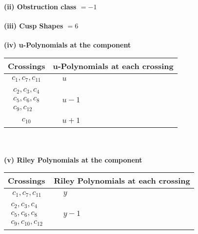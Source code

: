 \documentclass[1p]{elsarticle_modified}
\theoremstyle{definition}
\begin{document}
\flushleft \textbf{(ii) Obstruction class $= -1$}\\~\\
\flushleft \textbf{(iii) Cusp Shapes $= 6$}\\~\\
\newpage\renewcommand{\arraystretch}{1}
\flushleft \textbf{(iv) u-Polynomials at the component}\newline \\
\begin{tabular}{m{50pt}|m{274pt}}
Crossings & \hspace{64pt}u-Polynomials at each crossing \\
\hline $$\begin{aligned}c_{1},c_{7},c_{11}\end{aligned}$$&$\begin{aligned}
&u
\end{aligned}$\\
\hline $$\begin{aligned}c_{2},c_{3},c_{4}\\c_{5},c_{6},c_{8}\\c_{9},c_{12}\end{aligned}$$&$\begin{aligned}
&u-1
\end{aligned}$\\
\hline $$\begin{aligned}c_{10}\end{aligned}$$&$\begin{aligned}
&u+1
\end{aligned}$\\
\hline
\end{tabular}\\~\\
\newpage\renewcommand{\arraystretch}{1}
\flushleft \textbf{(v) Riley Polynomials at the component}\newline \\
\begin{tabular}{m{50pt}|m{274pt}}
Crossings & \hspace{64pt}Riley Polynomials at each crossing \\
\hline $$\begin{aligned}c_{1},c_{7},c_{11}\end{aligned}$$&$\begin{aligned}
&y
\end{aligned}$\\
\hline $$\begin{aligned}c_{2},c_{3},c_{4}\\c_{5},c_{6},c_{8}\\c_{9},c_{10},c_{12}\end{aligned}$$&$\begin{aligned}
&y-1
\end{aligned}$\\
\hline
\end{tabular}\\~\\
\end{document}
